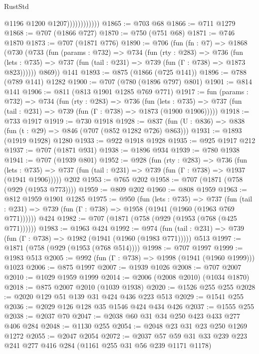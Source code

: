\begin{lexlean}{RustStd}
\begin{coremodule}
                            @1196
                            @1200
                            @1207))))))))))))
@1865 := @703 @68
@1866 := @711 @1279
@1868 := @707 (@1866 @727)
@1870 := @750 (@751 @68)
@1871 := @746 @1870
@1873 := @707 (@1871 @776)
@1890 := @706
    (fun (fn : @7) =>
    @1868
      (@730
        (@733
          (fun (params : @732) =>
          @734
            (fun (rty : @283) =>
            @736
              (fun (lets : @735) =>
              @737 (fun (tail : @231) => @739 (fun (Γ : @738) => @1873 @823))))))
        @869))
    @141
@1893 := @875 (@1866 (@725 @141))
@1896 := @788 (@789 @141) @1282
@1900 := @707 (@780 (@1896 @797) @801)
@1901 := @814 @141
@1906 := @811 (@813 @1901 @1285 @769 @771)
@1917 := fun (params : @732) =>
  @734
    (fun (rty : @283) =>
    @736
      (fun (lets : @735) =>
      @737 (fun (tail : @231) => @739 (fun (Γ : @738) => @1873 (@1900 @1906)))))
@1918 := @733 @1917
@1919 := @730 @1918
@1928 := @837 (fun (U : @836) => @838 (fun (t : @29) => @846 (@707 (@852 @1282 @726) @863)))
@1931 := @1893 (@1919 @1928) @1280
@1933 := @922 @1918 @1928
@1935 := @925 @1917 @212
@1937 := @707 (@1871 @931)
@1938 := @1896 @934
@1939 := @780 @1938
@1941 := @707 (@1939 @801)
@1952 := @928
    (fun (rty : @283) =>
    @736
      (fun (lets : @735) =>
      @737 (fun (tail : @231) => @739 (fun (Γ : @738) => @1937 (@1941 @1906)))))
    @202
@1953 := @765 @202
@1958 := @707 (@1871 (@758 (@929 (@1953 @773))))
@1959 := @809 @202
@1960 := @808 @1959
@1963 := @812 @1959 @1901 @1285
@1975 := @950
    (fun (lets : @735) =>
    @737 (fun (tail : @231) => @739 (fun (Γ : @738) => @1958 (@1941 (@1960 (@1963 @769 @771))))))
    @424
@1982 := @707 (@1871 (@758 (@929 (@1953 (@768 (@425 @771))))))
@1983 := @1963 @424
@1992 := @974
    (fun (tail : @231) => @739 (fun (Γ : @738) => @1982 (@1941 (@1960 (@1983 @771)))))
    @513
@1997 := @1871 (@758 (@929 (@1953 (@768 @514))))
@1998 := @707 @1997
@1999 := @1983 @513
@2005 := @992 (fun (Γ : @738) => @1998 (@1941 (@1960 @1999))) @1023
@2006 := @875 @1997
@2007 := @1939 @1026
@2008 := @707 @2007
@2010 := @1029 @1959 @1999
@2014 := @2006 (@2008 @2010) (@1034 @1870)
@2018 := @875 @2007 @2010 (@1039 @1938)
@2020 := @1526 @255 @255
@2028 := @2020 @129 @51 @139 @31 @424 @436 @223 @513
@2029 := @1541 @255
@2036 := @2029 @126 @128 @35 @1546 @424 @434 @426
@2037 := @1555 @255
@2038 := @2037 @70
@2047 := @2038 @60 @31 @34 @250 @423 @433 @277 @406 @284
@2048 := @1130 @255
@2054 := @2048 @23 @31 @23 @250 @1269 @1272
@2055 := @2047 @2054
@2072 := @2037 @57 @59 @31 @33 @239 @223 @241 @277 @416 @284 (@1161 @255 @31 @56 @239 @1171 @1178)

\end{coremodule}
\end{lexlean}
